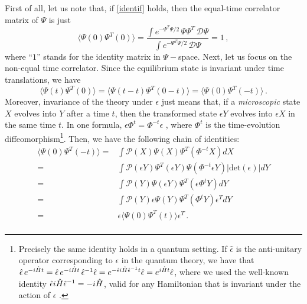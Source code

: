 \documentclass[a4paper, amsfonts, amssymb, amsmath, reprint, showkeys, nofootinbib, twoside,notitlepage,onecolumn]{revtex4-1}
\theoremstyle{definition}
\theoremstyle{theorem}
\begin{document}
First of all, let us note that, if \eqref{identif} holds, then the equal-time correlator matrix of $\Psi$ is just
\begin{equation}\label{a1}
\langle \Psi(0) \Psi^T(0)\rangle =\dfrac{\int e^{-\Psi^T\Psi/2}\, \Psi \Psi^T \, \mathcal{D}\Psi}{\int e^{- \Psi^T \Psi/2} \, \mathcal{D}\Psi}= 1 \, ,
\end{equation}
where ``$1$'' stands for the identity matrix in $\Psi-$space. Next, let us focus on the non-equal time correlator. Since the equilibrium state is invariant under time translations, we have
\begin{equation}\label{psittt}
\langle \Psi(t) \Psi^T(0)\rangle=\langle \Psi(t{-}t) \Psi^T(0{-}t)\rangle=\langle \Psi(0) \Psi^T(-t)\rangle \, .  
\end{equation}
Moreover, invariance of the theory under $\epsilon$ just means that, if a \textit{microscopic} state $X$ evolves into $Y$ after a time $t$, then the transformed state $\epsilon Y$ evolves into $\epsilon X$ in the same time $t$. In one formula, $\epsilon\Phi^{t}=\Phi^{-t} \epsilon$ \cite{Carbone2020}, where $\Phi^t$ is the time-evolution diffeomorphism\footnote{Precisely the same identity holds in a quantum setting. If $\hat{\epsilon}$ is the anti-unitary operator corresponding to $\epsilon$ in the quantum theory, we have that $\Hat{\epsilon}\,e^{-i\Hat{H}t}=\Hat{\epsilon}\,e^{-i\Hat{H}t}\,\Hat{\epsilon}^{-1}\Hat{\epsilon}=e^{-\Hat{\epsilon}i\Hat{H}\Hat{\epsilon}^{-1} t}\Hat{\epsilon}=e^{i\Hat{H} t}\Hat{\epsilon}$, where we used the well-known identity $\hat{\epsilon}i\Hat{H}\hat{\epsilon}^{-1}=-i\hat{H}$, valid for any Hamiltonian that is invariant under the action of $\epsilon$ \cite[\S 2.6]{weinbergQFT_1995}.}. Then, we have the following chain of identities:
\begin{equation}\label{epsiiii}
\begin{split}
\langle \Psi(0) \Psi^T(-t)\rangle ={}& \int \mathcal{P}(X)\Psi(X)\Psi^T(\Phi^{-t} X) dX \\
={}& \int \mathcal{P}(\epsilon Y)\Psi^T(\epsilon Y)\Psi(\Phi^{-t} \epsilon Y) |\text{det}(\epsilon)|dY \\
={}& \int \mathcal{P}(Y)\Psi(\epsilon Y)\Psi^T(\epsilon\Phi^{t} Y) dY \\
={}& \int \mathcal{P}(Y)\epsilon\Psi( Y)\Psi^T(\Phi^{t} Y)\epsilon^T dY \\
={}& \epsilon\langle \Psi(0) \Psi^T(t)\rangle \epsilon^T \, . \\
\end{split}
\end{equation}
\end{document}
